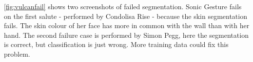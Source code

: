 \autoref{fig:vulcanfail} shows two screenshots of failed segmentation. Sonic Gesture fails on the first salute - performed by Condolisa Rise - because the skin segmentation fails. The skin colour of her face has more in common with the wall than with her hand. The second failure case is performed by Simon Pegg, here the segmentation is correct, but classification is just wrong. More training data could fix this problem.

\begin{figure}[htbp]
\centering
{}
\hspace{0.09\linewidth}
\hspace{0.09\linewidth}
\hspace{0.09\linewidth}

\end{figure}
